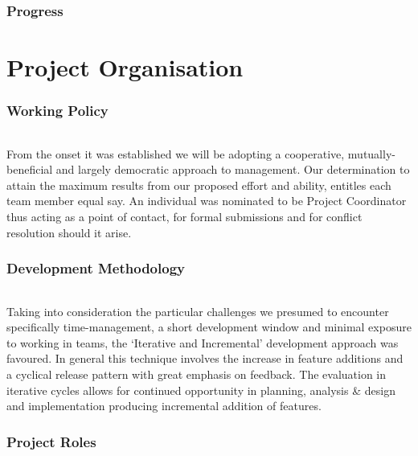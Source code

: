 \documentclass[11pt,a4paper]{article}
\begin{document}
\section{Progress}
\paragraph{}


\pagebreak

\part{Project Organisation}

\section{Working Policy}
\paragraph{}
From the onset it was established we will be adopting a cooperative, mutually-beneficial and largely democratic approach to management.  Our determination to attain the maximum results from our proposed effort and ability, entitles each team member equal say.  An individual was nominated to be Project Coordinator thus acting as a point of contact, for formal submissions and for conflict resolution should it arise.

\section{Development Methodology}
\paragraph{}
Taking into consideration the particular challenges we presumed to encounter specifically time-management, a short development window and minimal exposure to working in teams, the ‘Iterative and Incremental’ development approach was favoured.  In general this technique involves the increase in feature additions and a cyclical release pattern with great emphasis on feedback.  The evaluation in iterative cycles allows for continued opportunity in planning, analysis \& design and implementation producing incremental addition of features.

\section{Project Roles}
\end{document}
